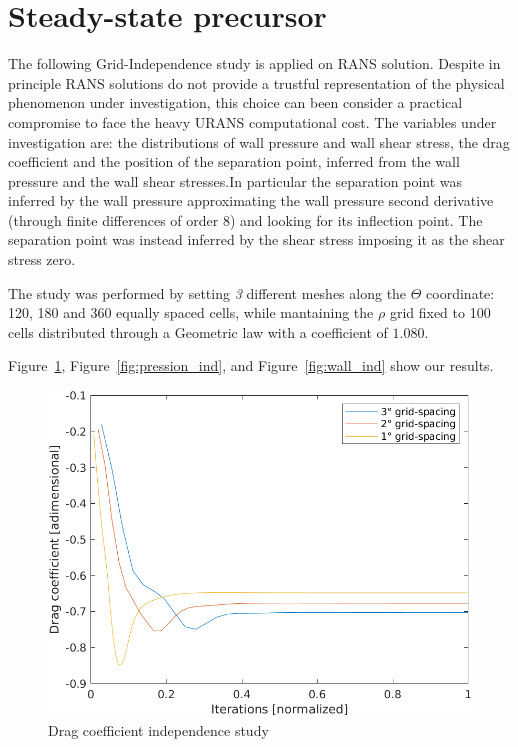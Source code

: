 \documentclass[12pt]{article}
\begin{document}
\section{Steady-state precursor} \label{sec:Steady-state precursor}

        The following Grid-Independence study is applied on RANS solution.   Despite in principle RANS solutions do not provide a trustful representation of the physical phenomenon under investigation, this choice can been consider a practical compromise to face the heavy URANS  computational cost. The variables under investigation are:  the distributions of wall pressure and wall shear stress, the drag coefficient and the position of the separation point, inferred from the wall pressure and the wall shear stresses.In particular the separation point was inferred by the wall pressure approximating the wall pressure second derivative (through finite differences of order 8) and looking for its inflection point. The separation point was instead inferred by the shear stress imposing it as the shear stress zero.
        
        The study was performed by setting \textit{3} different meshes along the $\Theta$ coordinate: 120, 180 and 360 equally spaced cells, while mantaining the $\rho$ grid fixed to 100 cells distributed through a Geometric law with a coefficient of $1.080$.

        Figure~\ref{fig:drag_independence}, Figure~\ref{fig:pression_ind}, and Figure~\ref{fig:wall_ind} show our results.

        \begin{figure}[!ht]
                \includegraphics[width=\textwidth]{DragCoefficient_Independence.png}
                \centering
                \caption{Drag coefficient independence study}
                \label{fig:drag_independence}
        \end{figure}
\end{document}
